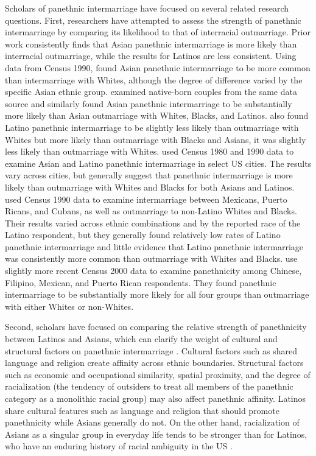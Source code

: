 \documentclass[11pt,]{article}
\begin{document}
Scholars of panethnic intermarriage have focused on several related research questions. First, researchers have attempted to assess the strength of panethnic intermarriage by comparing its likelihood to that of interracial outmarriage. Prior work consistently finds that Asian panethnic intermarriage is more likely than interracial outmarriage, while the results for Latinos are less consistent. Using data from Census 1990, \citet{qian_asian_2001} found Asian panethnic intermarriage to be more common than intermarriage with Whites, although the degree of difference varied by the specific Asian ethnic group. \citet{fu_how_2007a} examined native-born couples from the same data source and similarly found Asian panethnic intermarriage to be substantially more likely than Asian outmarriage with Whites, Blacks, and Latinos. \citet{fu_how_2007a} also found Latino panethnic intermarriage to be slightly less likely than outmarriage with Whites but more likely than outmarriage with Blacks and Asians, it was slightly less likely than outmarriage with Whites. \citet{rosenfeld_salience_2001} used Census 1980 and 1990 data to examine Asian and Latino panethnic intermarriage in select US cities. The results vary across cities, but generally suggest that panethnic intermarriage is more likely than outmarriage with Whites and Blacks for both Asians and Latinos. \citet{qian_latinos_2004} used Census 1990 data to examine intermarriage between Mexicans, Puerto Ricans, and Cubans, as well as outmarriage to non-Latino Whites and Blacks. Their results varied across ethnic combinations and by the reported race of the Latino respondent, but they generally found relatively low rates of Latino panethnic intermarriage and little evidence that Latino panethnic intermarriage was consistently more common than outmarriage with Whites and Blacks. \citet{qian_crossing_2012} use slightly more recent Census 2000 data to examine panethnicity among Chinese, Filipino, Mexican, and Puerto Rican respondents. They found panethnic intermarriage to be substantially more likely for all four groups than outmarriage with either Whites or non-Whites.

Second, scholars have focused on comparing the relative strength of panethnicity between Latinos and Asians, which can clarify the weight of cultural and structural factors on panethnic intermarriage \citep{lopez_panethnicity_1990}. Cultural factors such as shared language and religion create affinity across ethnic boundaries. Structural factors such as economic and occupational similarity, spatial proximity, and the degree of racialization (the tendency of outsiders to treat all members of the panethnic category as a monolithic racial group) may also affect panethnic affinity. Latinos share cultural features such as language and religion that should promote panethnicity while Asians generally do not. On the other hand, racialization of Asians as a singular group in everyday life tends to be stronger than for Latinos, who have an enduring history of racial ambiguity in the US \citep{lopez_panethnicity_1990, rodriguez_changing_2000a, fox_defining_2013}.
\end{document}
